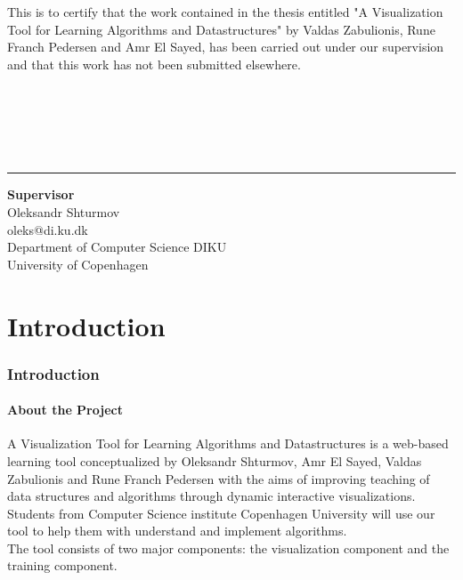 \documentclass[11pt]{article}
\begin{document}
This is to certify that the work contained in the thesis entitled "A Visualization Tool for Learning Algorithms and Datastructures" by Valdas Zabulionis, Rune Franch Pedersen and Amr El Sayed, has been carried out under our supervision and that this work has not been submitted elsewhere.\\\\\\\\\\\\
\begin{center}\noindent\rule{8cm}{0.4pt}%

\begin{center}
\textbf{Supervisor}\\
Oleksandr Shturmov \\
oleks@di.ku.dk \\
Department of Computer Science DIKU \\
University of Copenhagen
\end{center}
\newpage
\tableofcontents
\end{center}
\newpage
\part{Introduction}
\section{Introduction}
\subsection{About the Project}
A Visualization Tool for Learning Algorithms and Datastructures is a web-based learning tool conceptualized by Oleksandr Shturmov, Amr El Sayed, Valdas Zabulionis and Rune Franch Pedersen with the aims of improving teaching of data structures and algorithms through dynamic interactive visualizations. Students from Computer Science institute Copenhagen University will use our tool to help them with understand and implement algorithms. \\
The tool consists of two major components: the visualization component and the training component.
\end{document}
